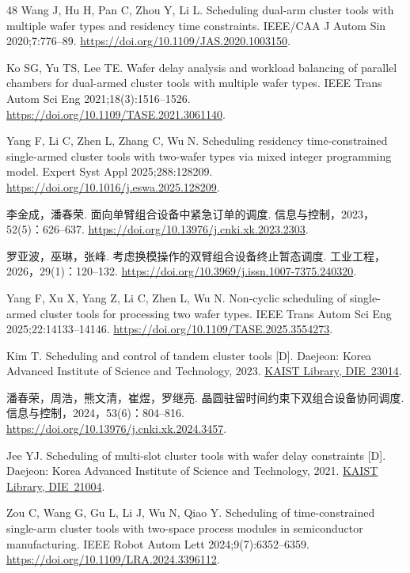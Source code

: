 \begin{thebibliography}{48}
Wang J, Hu H, Pan C, Zhou Y, Li L. Scheduling dual-arm cluster tools with multiple wafer types and residency time constraints.
IEEE/CAA J Autom Sin 2020;7:776--89.
\url{https://doi.org/10.1109/JAS.2020.1003150}.

Ko SG, Yu TS, Lee TE. Wafer delay analysis and workload balancing of parallel chambers for dual-armed cluster tools with multiple wafer types.
IEEE Trans Autom Sci Eng 2021;18(3):1516--1526.
\url{https://doi.org/10.1109/TASE.2021.3061140}.

Yang F, Li C, Zhen L, Zhang C, Wu N. Scheduling residency time-constrained single-armed cluster tools with two-wafer types via mixed integer programming model.
Expert Syst Appl 2025;288:128209.
\url{https://doi.org/10.1016/j.eswa.2025.128209}.

李金成，潘春荣. 面向单臂组合设备中紧急订单的调度. 信息与控制，2023，52(5)：626--637.
\url{https://doi.org/10.13976/j.cnki.xk.2023.2303}.

罗亚波，巫琳，张峰. 考虑换模操作的双臂组合设备终止暂态调度. 工业工程，2026，29(1)：120--132.
\url{https://doi.org/10.3969/j.issn.1007-7375.240320}.

Yang F, Xu X, Yang Z, Li C, Zhen L, Wu N. Non-cyclic scheduling of single-armed cluster tools for processing two wafer types.
IEEE Trans Autom Sci Eng 2025;22:14133--14146.
\url{https://doi.org/10.1109/TASE.2025.3554273}.

Kim T. Scheduling and control of tandem cluster tools [D]. Daejeon: Korea Advanced Institute of Science and Technology, 2023.
\href{https://library.kaist.ac.kr/search/detail/view.do?bibCtrlNo=1046815&flag=dissertation}{KAIST Library, DIE~23014}.

潘春荣，周浩，熊文清，崔煜，罗继亮. 晶圆驻留时间约束下双组合设备协同调度. 信息与控制，2024，53(6)：804--816.
\url{https://doi.org/10.13976/j.cnki.xk.2024.3457}.

Jee YJ. Scheduling of multi-slot cluster tools with wafer delay constraints [D]. Daejeon: Korea Advanced Institute of Science and Technology, 2021.
\href{https://library.kaist.ac.kr/search/detail/view.do?bibCtrlNo=956468&flag=dissertation}{KAIST Library, DIE~21004}.

Zou C, Wang G, Gu L, Li J, Wu N, Qiao Y. Scheduling of time-constrained single-arm cluster tools with two-space process modules in semiconductor manufacturing.
IEEE Robot Autom Lett 2024;9(7):6352--6359.
\url{https://doi.org/10.1109/LRA.2024.3396112}.


\end{thebibliography}
